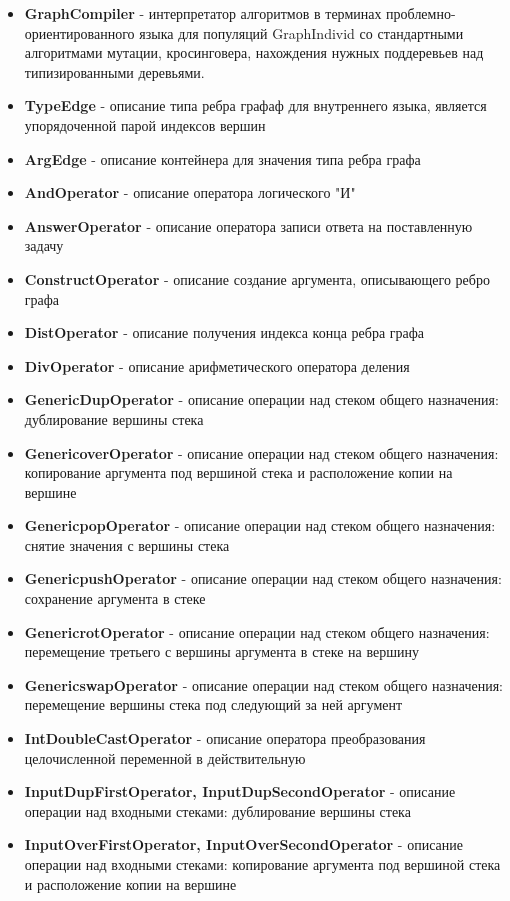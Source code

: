 \documentclass[russian,utf8,emptystyle]{eskdtext}
\begin{document}
\begin{itemize}
\item \textbf{GraphCompiler} - интерпретатор алгоритмов в терминах проблемно-ориентированного языка для популяций GraphIndivid со стандартными алгоритмами мутации, кросинговера, нахождения нужных поддеревьев над типизированными деревьями.
\item \textbf{TypeEdge} - описание типа ребра графаф для внутреннего языка, является упорядоченной парой индексов вершин
\item \textbf{ArgEdge} - описание контейнера для значения типа ребра графа
\item \textbf{AndOperator} - описание оператора логического "И"
\item \textbf{AnswerOperator} - описание оператора записи ответа на поставленную задачу
\item \textbf{ConstructOperator} - описание создание аргумента, описывающего ребро графа
\item \textbf{DistOperator} - описание получения индекса конца ребра графа
\item \textbf{DivOperator} - описание арифметического оператора деления
\item \textbf{GenericDupOperator} - описание операции над стеком общего назначения: дублирование вершины стека
\item \textbf{GenericoverOperator} - описание операции над стеком общего назначения: копирование аргумента под вершиной стека и расположение копии на вершине
\item \textbf{GenericpopOperator} - описание операции над стеком общего назначения: снятие значения с вершины стека
\item \textbf{GenericpushOperator} - описание операции над стеком общего назначения: сохранение аргумента в стеке
\item \textbf{GenericrotOperator} -  описание операции над стеком общего назначения: перемещение третьего с вершины аргумента в стеке на вершину
\item \textbf{GenericswapOperator} - описание операции над стеком общего назначения: перемещение вершины стека под следующий за ней аргумент
\item \textbf{IntDoubleCastOperator} -  описание оператора преобразования целочисленной переменной в действительную
\item \textbf{InputDupFirstOperator, InputDupSecondOperator} - описание операции над входными стеками: дублирование вершины стека
\item \textbf{InputOverFirstOperator, InputOverSecondOperator} - описание операции над входными стеками: копирование аргумента под вершиной стека и расположение копии на вершине

\end{itemize}
\end{document}
